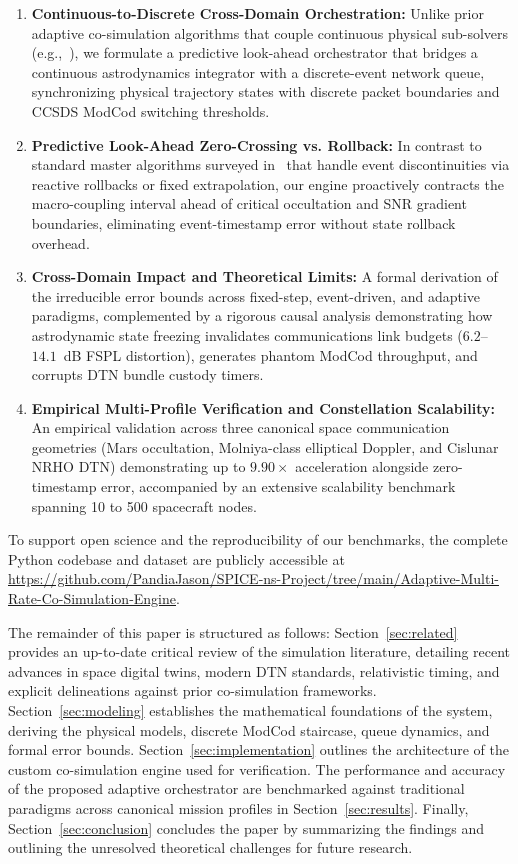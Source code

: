 \documentclass[a4paper,fleqn]{cas-sc}
\begin{document}
\begin{enumerate}
    \item \textbf{Continuous-to-Discrete Cross-Domain Orchestration:} Unlike prior adaptive co-simulation algorithms that couple continuous physical sub-solvers (e.g.,~\cite{simpat_adaptive}), we formulate a predictive look-ahead orchestrator that bridges a continuous astrodynamics integrator with a discrete-event network queue, synchronizing physical trajectory states with discrete packet boundaries and CCSDS ModCod switching thresholds.
    \item \textbf{Predictive Look-Ahead Zero-Crossing vs. Rollback:} In contrast to standard master algorithms surveyed in~\cite{simpat_multirate} that handle event discontinuities via reactive rollbacks or fixed extrapolation, our engine proactively contracts the macro-coupling interval ahead of critical occultation and SNR gradient boundaries, eliminating event-timestamp error without state rollback overhead.
    \item \textbf{Cross-Domain Impact and Theoretical Limits:} A formal derivation of the irreducible error bounds across fixed-step, event-driven, and adaptive paradigms, complemented by a rigorous causal analysis demonstrating how astrodynamic state freezing invalidates communications link budgets ($6.2$--$14.1$~dB FSPL distortion), generates phantom ModCod throughput, and corrupts DTN bundle custody timers.
    \item \textbf{Empirical Multi-Profile Verification and Constellation Scalability:} An empirical validation across three canonical space communication geometries (Mars occultation, Molniya-class elliptical Doppler, and Cislunar NRHO DTN) demonstrating up to $9.90\times$ acceleration alongside zero-timestamp error, accompanied by an extensive scalability benchmark spanning 10 to 500 spacecraft nodes.
\end{enumerate}

To support open science and the reproducibility of our benchmarks, the complete Python codebase and dataset are publicly accessible at \url{https://github.com/PandiaJason/SPICE-ns-Project/tree/main/Adaptive-Multi-Rate-Co-Simulation-Engine}.

The remainder of this paper is structured as follows: Section~\ref{sec:related} provides an up-to-date critical review of the simulation literature, detailing recent advances in space digital twins, modern DTN standards, relativistic timing, and explicit delineations against prior co-simulation frameworks. Section~\ref{sec:modeling} establishes the mathematical foundations of the system, deriving the physical models, discrete ModCod staircase, queue dynamics, and formal error bounds. Section~\ref{sec:implementation} outlines the architecture of the custom co-simulation engine used for verification. The performance and accuracy of the proposed adaptive orchestrator are benchmarked against traditional paradigms across canonical mission profiles in Section~\ref{sec:results}. Finally, Section~\ref{sec:conclusion} concludes the paper by summarizing the findings and outlining the unresolved theoretical challenges for future research.
\end{document}

